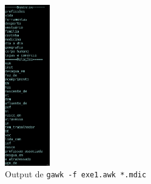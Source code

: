 \documentclass{llncs}
\begin{document}
\begin{figure}[H]
    \centering
    \includegraphics[height=7cm]{Exe1Out.png}
    \caption{Output de \texttt{gawk -f exe1.awk *.mdic}}
\end{figure}
\end{document}
